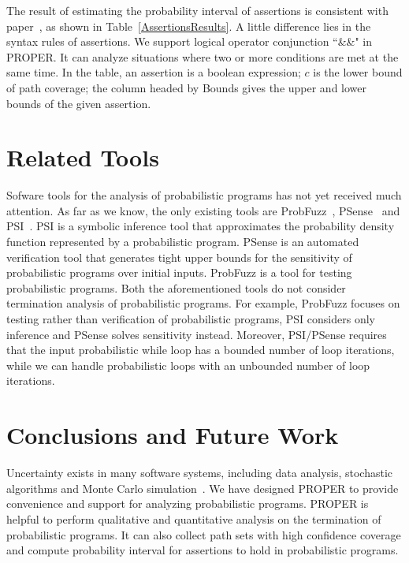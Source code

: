 \documentclass[sigconf,review, anonymous]{acmart}
\begin{document}
The result of estimating the probability interval of assertions is consistent with paper~\cite{Sankaranarayanan2013Static}, as shown in Table~\ref{AssertionsResults}. A little difference lies in the syntax rules of assertions. We support logical operator conjunction ``\&\&" in PROPER. It can analyze situations where two or more conditions are met at the same time. In the table, an assertion is a boolean expression; $c$ is the lower bound of path coverage; the column headed by Bounds gives the upper and lower bounds of the given assertion.%

\section{Related Tools}
Sofware tools for the analysis of probabilistic programs has not yet received much attention. 
As far as we know, the only existing tools are ProbFuzz~\cite{DBLP:conf/sigsoft/DuttaLHM18}, PSense~\cite{DBLP:conf/atva/HuangWM18} and PSI~\cite{DBLP:conf/cav/GehrMV16}.
PSI is a symbolic inference tool that approximates the probability density function represented by a probabilistic program. 
PSense is an automated verification tool that generates tight upper bounds for the sensitivity of probabilistic programs over initial inputs.
ProbFuzz is a tool for testing probabilistic programs. 
Both the aforementioned tools do not consider termination analysis of probabilistic programs. 
For example, ProbFuzz focuses on testing rather than verification of probabilistic programs, 
PSI considers only inference and PSense solves sensitivity instead. 
Moreover, PSI/PSense requires that the input probabilistic while loop has a bounded number of loop iterations, while we can handle probabilistic loops with an unbounded number of loop iterations.

\section{Conclusions and Future Work}
Uncertainty exists in many software systems, including data analysis, stochastic algorithms and Monte Carlo simulation~\cite{HASTINGS1970Monte}. We have designed PROPER  to provide convenience and support for analyzing probabilistic programs.
PROPER is helpful to perform qualitative and quantitative analysis on the termination of probabilistic programs. It can also collect path sets with high confidence coverage and compute  probability interval for assertions to hold in probabilistic programs.
\end{document}
